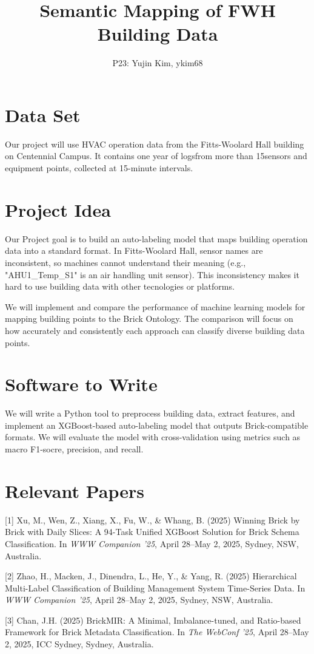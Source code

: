 \documentclass{article}
\title{Semantic Mapping of FWH Building Data}
\author{%
  P23: Yujin Kim, ykim68\\
}
\begin{document}
\maketitle

\section{Data Set}

Our project will use HVAC operation data from the Fitts-Woolard Hall building on Centennial Campus. It contains one year of logsfrom more than 15sensors and equipment points, collected at 15-minute intervals.


\section{Project Idea}

Our Project goal is to build an auto-labeling model that maps building operation data into a standard format. In Fitts-Woolard Hall, sensor names are inconsistent, so machines cannot understand their meaning (e.g., "AHU1\_Temp\_{S1}" is an air handling unit sensor). This inconsistency makes it hard to use building data with other tecnologies or platforms.

We will implement and compare the performance of machine learning models for mapping building points to the Brick Ontology. The comparison will focus on how accurately and consistently each approach can classify diverse building data points.


\section{Software to Write}

We will write a Python tool to preprocess building data, extract features, and implement an XGBoost-based auto-labeling model that outputs Brick-compatible formats. We will evaluate the model with cross-validation using metrics such as macro F1-socre, precision, and recall.


\section{Relevant Papers}

\medskip

{
\small


[1] Xu, M., Wen, Z., Xiang, X., Fu, W., \& Whang, B. (2025) Winning Brick by Brick with Daily Slices: A 94-Task Unified XGBoost Solution for Brick Schema Classification. In {\it WWW Companion ’25}, April 28–May 2, 2025, Sydney, NSW, Australia.

[2] Zhao, H., Macken, J., Dinendra, L., He, Y., \& Yang, R. (2025) Hierarchical Multi-Label Classification of Building Management System Time-Series Data. In {\it WWW Companion ’25}, April 28–May 2, 2025, Sydney, NSW, Australia.

[3] Chan, J.H. (2025) BrickMIR: A Minimal, Imbalance-tuned, and Ratio-based Framework for Brick Metadata Classification. In {\it The WebConf ’25}, April 28–May 2, 2025, ICC Sydney, Sydney, Australia.
}
\end{document}

